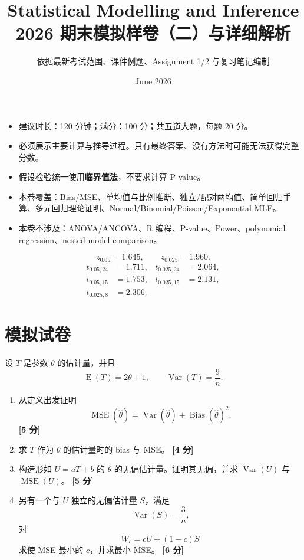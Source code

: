 \documentclass[11pt,a4paper]{article}
\title{\textbf{Statistical Modelling and Inference}\\[0.3em]
2026 期末模拟样卷（二）与详细解析}
\author{依据最新考试范围、课件例题、Assignment 1/2 与复习笔记编制}
\date{June 2026}
\newcommand{\E}{\operatorname{E}}
\newcommand{\Var}{\operatorname{Var}}
\newcommand{\Bias}{\operatorname{Bias}}
\newcommand{\MSE}{\operatorname{MSE}}
\newcommand{\pts}[1]{\hfill\textbf{[#1 分]}}
\begin{document}
\maketitle

\begin{instructionbox}[考试说明]
\begin{itemize}
  \item 建议时长：120 分钟；满分：100 分；共五道大题，每题 20 分。
  \item 必须展示主要计算与推导过程。只有最终答案、没有方法时可能无法获得完整分数。
  \item 假设检验统一使用\textbf{临界值法}，不要求计算 P-value。
  \item 本卷覆盖：Bias/MSE、单均值与比例推断、独立/配对两均值、简单回归手算、多元回归理论证明、Normal/Binomial/Poisson/Exponential MLE。
  \item 本卷不涉及：ANOVA/ANCOVA、R 编程、P-value、Power、polynomial regression、nested-model comparison。
\end{itemize}
\end{instructionbox}

\begin{instructionbox}[本卷可直接使用的临界值]
\[
  z_{0.05}=1.645,
  \qquad
  z_{0.025}=1.960.
\]
\[
\begin{aligned}
  t_{0.05,24}&=1.711,
  &t_{0.025,24}&=2.064,\\
  t_{0.05,15}&=1.753,
  &t_{0.025,15}&=2.131,\\
  t_{0.025,8}&=2.306.
\end{aligned}
\]
\end{instructionbox}

\tableofcontents
\newpage

\section{模拟试卷}

\begin{questionbox}
设 $T$ 是参数 $\theta$ 的估计量，并且
\[
  \E(T)=2\theta+1,
  \qquad
  \Var(T)=\frac9n.
\]

\begin{enumerate}
  \item 从定义出发证明
  \[
    \MSE(\hat\theta)
    =
    \Var(\hat\theta)+\Bias(\hat\theta)^2.
  \]
  \pts{5}

  \item 求 $T$ 作为 $\theta$ 的估计量时的 bias 与 MSE。 \pts{4}

  \item 构造形如 $U=aT+b$ 的 $\theta$ 的无偏估计量。证明其无偏，并求
  $\Var(U)$ 与 $\MSE(U)$。 \pts{5}

  \item 另有一个与 $U$ 独立的无偏估计量 $S$，满足
  \[
    \Var(S)=\frac3n.
  \]
  对
  \[
    W_c=cU+(1-c)S
  \]
  求使 MSE 最小的 $c$，并求最小 MSE。 \pts{6}
\end{enumerate}
\end{questionbox}
\end{document}
